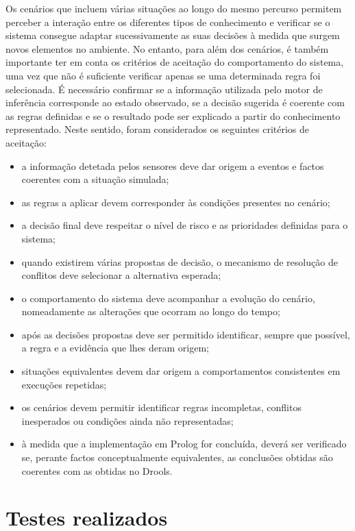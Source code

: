 Os cenários que incluem várias situações ao longo do mesmo percurso permitem
perceber a interação entre os diferentes tipos de conhecimento e verificar se
o sistema consegue adaptar sucessivamente as suas decisões à medida que
surgem novos elementos no ambiente. No entanto, para além dos cenários, é
também importante ter em conta os critérios de aceitação do comportamento do
sistema, uma vez que não é suficiente verificar apenas se uma determinada
regra foi selecionada. É necessário confirmar se a informação utilizada pelo
motor de inferência corresponde ao estado observado, se a decisão sugerida é
coerente com as regras definidas e se o resultado pode ser explicado a partir
do conhecimento representado. Neste sentido, foram considerados os seguintes
critérios de aceitação:
\begin{itemize}
  \item a informação detetada pelos sensores deve dar origem a eventos e
    factos coerentes com a situação simulada;
  \item as regras a aplicar devem corresponder às condições presentes no
    cenário;
  \item a decisão final deve respeitar o nível de risco e as prioridades
    definidas para o sistema;
  \item quando existirem várias propostas de decisão, o mecanismo de
    resolução de conflitos deve selecionar a alternativa esperada;
  \item o comportamento do sistema deve acompanhar a evolução do cenário,
    nomeadamente as alterações que ocorram ao longo do tempo;
  \item após as decisões propostas deve ser permitido identificar, sempre que
    possível, a regra e a evidência que lhes deram origem;
  \item situações equivalentes devem dar origem a comportamentos consistentes
    em execuções repetidas;
  \item os cenários devem permitir identificar regras incompletas, conflitos
    inesperados ou condições ainda não representadas;
  \item à medida que a implementação em Prolog for concluída, deverá ser
    verificado se, perante factos conceptualmente equivalentes, as conclusões
    obtidas são coerentes com as obtidas no Drools.
\end{itemize}

\section{Testes realizados}
\label{sec:testes}

